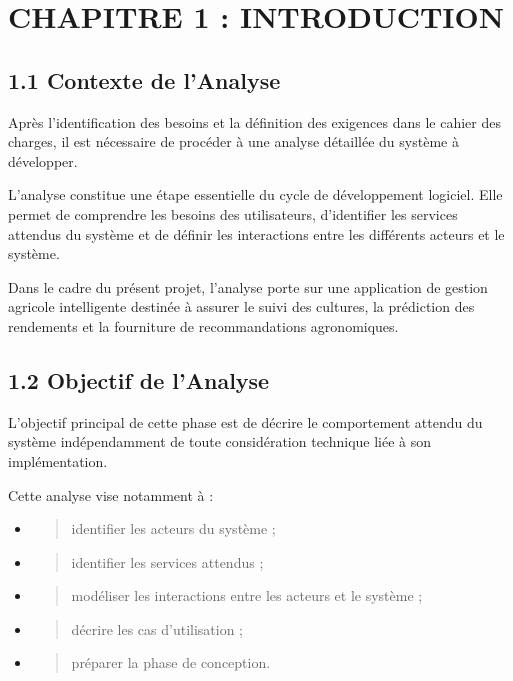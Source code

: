 \documentclass[
]{book}
\author{}
\date{}
\begin{document}
\frontmatter

\mainmatter
\hypertarget{chapitre-1-introduction}{%
\chapter{CHAPITRE 1 : INTRODUCTION}\label{chapitre-1-introduction}}

\hypertarget{contexte-de-lanalyse}{%
\section{1.1 Contexte de l'Analyse}\label{contexte-de-lanalyse}}

Après l'identification des besoins et la définition des exigences dans
le cahier des charges, il est nécessaire de procéder à une analyse
détaillée du système à développer.

L'analyse constitue une étape essentielle du cycle de développement
logiciel. Elle permet de comprendre les besoins des utilisateurs,
d'identifier les services attendus du système et de définir les
interactions entre les différents acteurs et le système.

Dans le cadre du présent projet, l'analyse porte sur une application de
gestion agricole intelligente destinée à assurer le suivi des cultures,
la prédiction des rendements et la fourniture de recommandations
agronomiques.

\hypertarget{objectif-de-lanalyse}{%
\section{1.2 Objectif de l'Analyse}\label{objectif-de-lanalyse}}

L'objectif principal de cette phase est de décrire le comportement
attendu du système indépendamment de toute considération technique liée
à son implémentation.

Cette analyse vise notamment à :

\begin{itemize}
\item
  \begin{quote}
  identifier les acteurs du système ;
  \end{quote}
\item
  \begin{quote}
  identifier les services attendus ;
  \end{quote}
\item
  \begin{quote}
  modéliser les interactions entre les acteurs et le système ;
  \end{quote}
\item
  \begin{quote}
  décrire les cas d'utilisation ;
  \end{quote}
\item
  \begin{quote}
  préparer la phase de conception.
  \end{quote}
\end{itemize}
\end{document}
